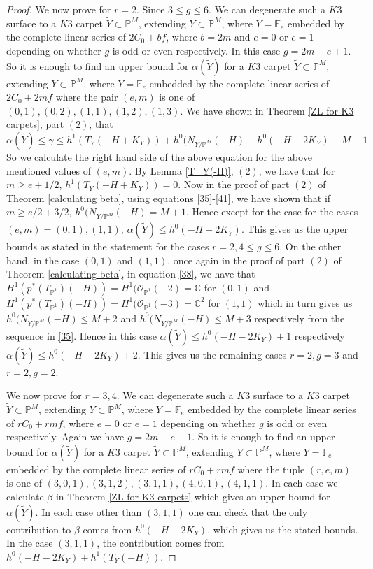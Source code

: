 \documentclass[11pt,twoside]{amsart}
\theoremstyle{plain}
\numberwithin{equation}{section}
\theoremstyle{definition}
\begin{document}
\begin{proof}
We now prove for $r = 2$. Since $3 \leq g \leq 6$. We can degenerate such a $K3$ surface to a $K3$ carpet $\widetilde{Y} \subset \mathbb{P}^M$, extending $Y \subset \mathbb{P}^M$, where $Y = \mathbb{F}_e$ embedded by the complete linear series of $2C_0+bf$, where $b = 2m$ and $e = 0$ or $e = 1$ depending on whether $g$ is odd or even respectively. In this case $g = 2m-e+1$. So it is enough to find an upper bound for $\alpha(\widetilde{Y})$ for a $K3$ carpet $\widetilde{Y} \subset \mathbb{P}^M$, extending $Y \subset \mathbb{P}^M$, where $Y = \mathbb{F}_e$ embedded by the complete linear series of $2C_0+2mf$ where the pair $(e,m)$ is one of $(0,1), (0,2), (1,1), (1,2), (1,3)$. We have shown in Theorem \ref{ZL for K3 carpets}, part $(2)$, that $$\alpha(\widetilde{Y})  \leq  \gamma \leq h^1(T_Y(-H+K_Y))+h^0(N_{Y/\mathbb{P}^M}(-H)+h^0(-H-2K_Y)-M-1 $$
So we calculate the right hand side of the above equation for the above mentioned values of $(e,m)$. By Lemma \ref{T_Y(-H)}, $(2)$, we have that for $m \geq e+1/2$, $h^1(T_Y(-H+K_Y)) = 0$. Now in the proof of part $(2)$ of Theorem \ref{calculating beta}, using equations \ref{35}-\ref{41}, we have shown that if $m \geq e/2+3/2$, $h^0(N_{Y/\mathbb{P}^M}(-H) = M+1$. Hence except for the case for the cases $(e,m) = (0,1), (1,1)$, $\alpha(\widetilde{Y}) \leq h^0(-H-2K_Y)$. This gives us the upper bounds as stated in the statement for the cases $r = 2, 4 \leq g \leq 6$. On the other hand, in the case $(0,1)$ and $(1,1)$, once again in the proof of part $(2)$ of Theorem \ref{calculating beta}, in equation \ref{38}, we have that $H^1(p^*(T_{\mathbb{P}^1})(-H)) = H^1(\mathcal{O}_{\mathbb{P}^1}(-2) = \mathbb{C}$ for $(0,1)$ and $H^1(p^*(T_{\mathbb{P}^1})(-H)) = H^1(\mathcal{O}_{\mathbb{P}^1}(-3) = \mathbb{C}^2$ for $(1,1)$ which in turn gives us $h^0(N_{Y/\mathbb{P}^M}(-H) \leq M+2$ and $h^0(N_{Y/\mathbb{P}^M}(-H) \leq M+3$ respectively from the sequence in \ref{35}. Hence in this case $\alpha(\widetilde{Y}) \leq h^0(-H-2K_Y)+1$ respectively $\alpha(\widetilde{Y}) \leq h^0(-H-2K_Y)+2$. This gives us the remaining cases $r = 2, g = 3$ and $r = 2, g = 2$. \par

We now prove for $r = 3,4$. We can degenerate such a $K3$ surface to a $K3$ carpet $\widetilde{Y} \subset \mathbb{P}^M$, extending $Y \subset \mathbb{P}^M$, where $Y = \mathbb{F}_e$ embedded by the complete linear series of $rC_0+rmf$, where $e = 0$ or $e = 1$ depending on whether $g$ is odd or even respectively. Again we have $g = 2m-e+1$. So it is enough to find an upper bound for $\alpha(\widetilde{Y})$ for a $K3$ carpet $\widetilde{Y} \subset \mathbb{P}^M$, extending $Y \subset \mathbb{P}^M$, where $Y = \mathbb{F}_e$ embedded by the complete linear series of $rC_0+rmf$ where the tuple $(r,e,m)$ is one of $(3,0,1), (3,1,2), (3,1,1), (4,0,1), (4,1,1)$. In each case we calculate $\beta$ in Theorem \ref{ZL for K3 carpets} which gives an upper bound for $\alpha(\widetilde{Y})$. In each case other than $(3,1,1)$ one can check that the only contribution to $\beta$ comes from $h^0(-H-2K_Y)$, which gives us the stated bounds. In the case $(3,1,1)$, the contribution comes from $h^0(-H-2K_Y)+h^1(T_Y(-H))$. 
\end{proof}
\end{document}

